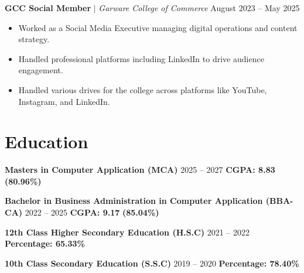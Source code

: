 \documentclass[a4paper,10pt]{article}
\begin{document}
\vspace{6pt}

\textbf{GCC Social Member} $|$ \textit{Garware College of Commerce} \hfill August 2023 -- May 2025
\begin{itemize}
    \item Worked as a Social Media Executive managing digital operations and content strategy.
    \item Handled professional platforms including LinkedIn to drive audience engagement.
    \item Handled various drives for the college across platforms like YouTube, Instagram, and LinkedIn.
\end{itemize}

\section*{Education}
\textbf{Masters in Computer Application (MCA)}  \hfill 2025 -- 2027 \quad \textbf{CGPA: 8.83} \textbf{(80.96\%)}

\vspace{4pt} 

\textbf{Bachelor in Business Administration in Computer Application (BBA-CA)}  \hfill 2022 -- 2025 \quad \textbf{CGPA: 9.17} \textbf{(85.04\%)}

\vspace{4pt} 

\textbf{12th Class Higher Secondary Education (H.S.C)}  \hfill 2021 -- 2022 \quad \textbf{Percentage: 65.33\%}

\vspace{4pt} 

\textbf{10th Class Secondary Education (S.S.C)}  \hfill 2019 -- 2020 \quad \textbf{Percentage: 78.40\%}
\end{document}
